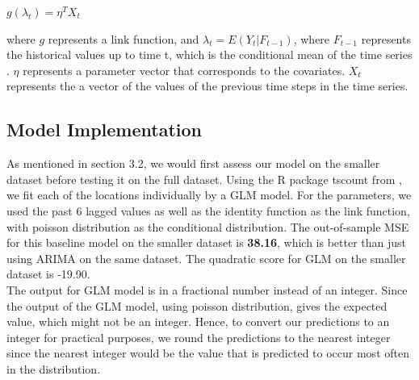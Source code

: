 \documentclass[nonblindrev,msom]{informs3} %
\begin{document}
\begin{center}
    $\displaystyle g(\lambda_t)= \eta^T X_t$
\end{center}

\noindent where $g$ represents a link function, and $\lambda_t = E(Y_t | F_{t-1})$, where $F_{t-1}$ represents the historical values up to time t, which is the conditional mean of the time series . $\eta$ represents a parameter vector that corresponds to the covariates. $X_t$ represents the a vector of the values of the previous time steps in the time series.




\subsection{Model Implementation}
\noindent As mentioned in section 3.2, we would first assess our model on the smaller dataset before testing it on the full dataset. Using the R package tscount from \cite{Tobias2017}, we fit each of the locations individually by a GLM model. For the parameters, we used the past 6 lagged values as well as the identity function as the link function, with poisson distribution as the conditional distribution. The out-of-sample MSE for this baseline model on the smaller dataset is \textbf{38.16}, which is better than just using ARIMA on the same dataset. The quadratic score for GLM on the smaller dataset is -19.90. \\

\noindent The output for GLM model is in a fractional number instead of an integer. Since the output of the GLM model, using poisson distribution, gives the expected value, which might not be an integer. Hence, to convert our predictions to an integer for practical purposes, we round the predictions to the nearest integer since the nearest integer would be the value that is predicted to occur most often in the distribution. \\
\end{document}
